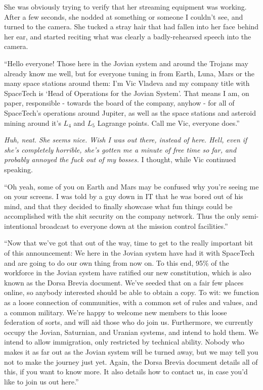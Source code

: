 \documentclass[a5paper]{report}%
\begin{document}
She was obviously trying to verify that her streaming equipment was working.
After a few seconds, she nodded at something or someone I couldn't see,
and turned to the camera. She tucked a stray hair that had fallen into her face
behind her ear, and started reciting what was clearly
a badly-rehearsed speech into the camera.

``Hello everyone! Those here in the Jovian system and around the Trojans
may already know me well, but
for everyone tuning in from Earth, Luna, Mars or the many space stations around
them: I'm Vic Vladeva and my company title with SpaceTech
is `Head of Operations for the Jovian System'. That means I am, on paper,
responsible - towards the board of the company, anyhow - for all of SpaceTech's
operations around Jupiter, as well as the space stations and asteroid mining
around it's $L_4$ and $L_5$ Lagrange points. Call me Vic, everyone does.''

\textit{Huh, neat. She seems nice. Wish I was out there, instead of here. Hell,
  even if she's completely horrible, she's gotten me a minute of free time so
  far, and probably annoyed the fuck out of my bosses.} I thought, while Vic
continued speaking.

``Oh yeah, some of you on Earth and Mars may be confused why you're seeing me on
your screens. I was told by a guy down in IT that he was bored out of his mind,
and that they decided to finally showcase what fun things could be accomplished
with the shit security on the company network. Thus the only semi-intentional
broadcast to everyone down at the mission control facilities.''

``Now that we've got that out of the way, time to get to the really important
bit of this announcement: We here in the Jovian system have had it with
SpaceTech and are going to do our own thing from now on. To this end, 95\% of
the workforce in the Jovian system have ratified our new constitution, which is
also known as the Dorsa Brevia document. We've seeded that on a fair few places
online, so anybody interested should be able to obtain a copy. To wit: we
function as a loose connection of communities, with a common set of rules and
values, and a common military. We're happy to welcome new members to this loose
federation of sorts, and will aid those who do join us. Furthermore, we
currently occupy the Jovian, Saturnian, and Uranian systems, and intend to hold
them. We intend to allow immigration, only restricted by technical ability.
Nobody who makes it as far out as the Jovian system will be turned away, but we
may tell you not to make the journey just yet. Again, the Dorsa Brevia document
details all of this, if you want to know more. It also details how to contact
us, in case you'd like to join us out here.''
\end{document}
